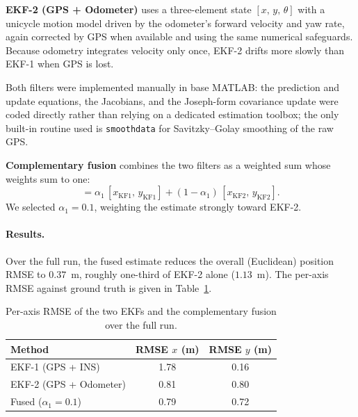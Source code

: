\documentclass[11pt,a4paper]{article}
\begin{document}
\textbf{EKF-2 (GPS + Odometer)} uses a three-element state $[x,\,y,\,\theta]$ with a
unicycle motion model driven by the odometer's forward velocity and yaw rate, again
corrected by GPS when available and using the same numerical safeguards. Because
odometry integrates velocity only once, EKF-2 drifts more slowly than EKF-1 when GPS
is lost.

Both filters were implemented manually in base MATLAB: the prediction and update
equations, the Jacobians, and the Joseph-form covariance update were coded directly
rather than relying on a dedicated estimation toolbox; the only built-in routine used
is \texttt{smoothdata} for Savitzky--Golay smoothing of the raw GPS.

\textbf{Complementary fusion} combines the two filters as a weighted sum whose
weights sum to one:
\begin{equation}
[x_{\text{fused}},\,y_{\text{fused}}]
= \alpha_1 \, [x_{\text{KF1}},\,y_{\text{KF1}}]
+ (1-\alpha_1)\,[x_{\text{KF2}},\,y_{\text{KF2}}].
\end{equation}
We selected $\alpha_1 = 0.1$, weighting the estimate strongly toward EKF-2.

\paragraph{Results.}
Over the full run, the fused estimate reduces the overall (Euclidean) position RMSE
to $0.37$~m, roughly one-third of EKF-2 alone ($1.13$~m). The per-axis RMSE against
ground truth is given in Table~\ref{tab:kalman}.

\begin{table}[H]
\centering
\begin{tabular}{lcc}
\toprule
\textbf{Method} & \textbf{RMSE $x$ (m)} & \textbf{RMSE $y$ (m)}\\
\midrule
EKF-1 (GPS + INS)        & 1.78 & 0.16\\
EKF-2 (GPS + Odometer)   & 0.81 & 0.80\\
Fused ($\alpha_1 = 0.1$) & 0.79 & 0.72\\
\bottomrule
\end{tabular}
\caption{Per-axis RMSE of the two EKFs and the complementary fusion over the full run.}
\label{tab:kalman}
\end{table}
\end{document}
